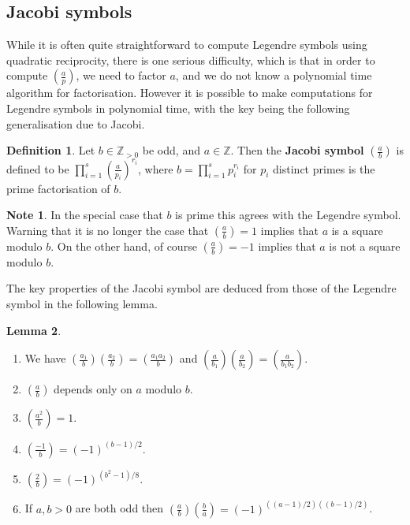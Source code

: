 \documentclass{article}
\newcommand{\Z}{\mathbb{Z}}
\newcommand{\rb}[1]{\left( #1 \right)}
\newcommand{\legendre}[2]{\rb{\tfrac{#1}{#2}}}
\theoremstyle{definition}\newtheorem{definition}{Definition}
\theoremstyle{definition}\newtheorem*{remark}{Remark}
\theoremstyle{definition}\newtheorem*{example}{Example}
\theoremstyle{definition}\newtheorem*{note}{Note}
\newtheorem{lemma}[definition]{Lemma}
\begin{document}
\subsection{Jacobi symbols}

While it is often quite straightforward to compute Legendre symbols using quadratic reciprocity, there is one serious difficulty, which is that in order to compute $ \legendre{a}{p} $, we need to factor $ a $, and we do not know a polynomial time algorithm for factorisation. However it is possible to make computations for Legendre symbols in polynomial time, with the key being the following generalisation due to Jacobi.

\begin{definition}
Let $ b \in \Z_{> 0} $ be odd, and $ a \in \Z $. Then the \textbf{Jacobi symbol} $ \legendre{a}{b} $ is defined to be $ \prod_{i = 1}^s \legendre{a}{p_i}^{r_i} $, where $ b = \prod_{i = 1}^s p_i^{r_i} $ for $ p_i $ distinct primes is the prime factorisation of $ b $.
\end{definition}

\begin{note}
In the special case that $ b $ is prime this agrees with the Legendre symbol. Warning that it is no longer the case that $ \legendre{a}{b} = 1 $ implies that $ a $ is a square modulo $ b $. On the other hand, of course $ \legendre{a}{b} = -1 $ implies that $ a $ is not a square modulo $ b $.
\end{note}


The key properties of the Jacobi symbol are deduced from those of the Legendre symbol in the following lemma.

\begin{lemma}
\hfill
\begin{enumerate}
\item We have $ \legendre{a_1}{b}\legendre{a_2}{b} = \legendre{a_1a_2}{b} $ and $ \legendre{a}{b_1}\legendre{a}{b_2} = \legendre{a}{b_1b_2} $.
\item $ \legendre{a}{b} $ depends only on $ a $ modulo $ b $.
\item $ \legendre{a^2}{b} = 1 $.
\item $ \legendre{-1}{b} = \rb{-1}^{\rb{b - 1} / 2} $.
\item $ \legendre{2}{b} = \rb{-1}^{\rb{b^2 - 1} / 8} $.
\item If $ a, b > 0 $ are both odd then $ \legendre{a}{b}\legendre{b}{a} = \rb{-1}^{\rb{\rb{a - 1} / 2}\rb{\rb{b - 1} / 2}} $.
\end{enumerate}
\end{lemma}
\end{document}
